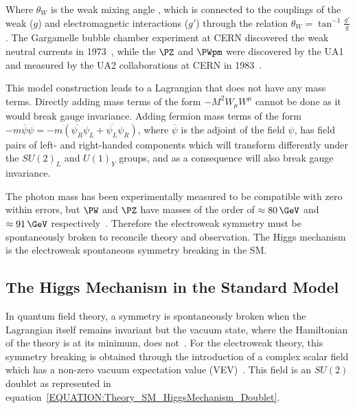Where  $\theta_{W}$ is the weak mixing angle \cite{ARTICLE:Weinberg}, which is connected to the couplings of the weak ($g$) and electromagnetic interactions ($g'$) through the relation $\theta_{W}=\tan^{-1}{\frac{g'}{g}}$. The Gargamelle bubble chamber experiment at CERN discovered the weak neutral currents in 1973~\cite{ARTICLE:GargamelleNeutrinoObservation}, while the $\PZ$ and $\PWpm$ were discovered by the UA1 and measured by the UA2 collaborations at CERN in 1983~\cite{ARTICLE:UA1WObservation,ARTICLE:UA2WObservation,ARTICLE:UA1ZObservation,ARTICLE:UA2ZObservation}.

This model construction leads to a Lagrangian that does not have any mass terms. Directly adding mass terms of the form $-M^{2}W_{\mu}W^{\mu}$ cannot be done as it would break gauge invariance. Adding fermion mass terms of the form $-m\overline{\psi}\psi = -m(\overline{\psi_{R}}\psi_{L} + \overline{\psi_{L}}\psi_{R})$, where $\overline\psi$ is the adjoint of the field $\psi$, has field pairs of left- and right-handed components which will transform differently under the $SU(2)_{L}$ and $U(1)_{Y}$ groups, and as a consequence will also break gauge invariance.

The photon mass has been experimentally measured to be compatible with zero within errors, but $\PW$ and $\PZ$ have masses of the order of $\approx 80\,\GeV$ and $\approx91\,\GeV$ respectively~\cite{ARTICLE:PDG2014}. Therefore the electroweak symmetry must be spontaneously broken to reconcile theory and observation. The Higgs mechanism is the electroweak spontaneous symmetry breaking in the \gls{SM}.

\subsection{The Higgs Mechanism in the Standard Model}
\label{SUBSECTION:Theory_SM_HiggsMechanism}


In quantum field theory, a symmetry is spontaneously broken when the Lagrangian itself remains invariant but the vacuum state, where the Hamiltonian of the theory is at its minimum, does not~\cite{ARTICLE:AitchisonGaugeTheories}. For the electroweak theory, this symmetry breaking is obtained through the introduction of a complex scalar field which has a non-zero vacuum expectation value (VEV)~\cite{ARTICLE:HiggsBrokenSymmetries1,ARTICLE:HiggsBrokenSymmetries2,ARTICLE:GlobalConservation,ARTICLE:HiggsSpontaneousSymmetryBreakdown,ARTICLE:SymmetryBreaking}. This field is an $SU(2)$ doublet as represented in equation~\ref{EQUATION:Theory_SM_HiggsMechanism_Doublet}.

